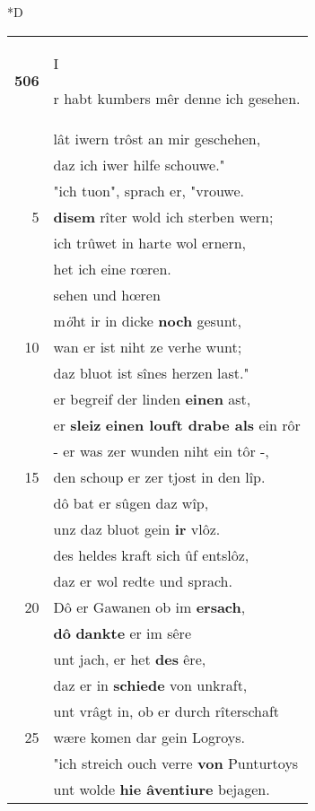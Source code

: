 \documentclass[8pt,a4paper,notitlepage]{article}
\begin{document}
\begin{table}[ht]
\begin{minipage}[t]{0.5\linewidth}
\small
\begin{center}*D
\end{center}
\begin{tabular}{rl}
\textbf{506} & \begin{large}I\end{large}r habt kumbers mêr denne ich gesehen.\\ 
 & lât iwern trôst an mir geschehen,\\ 
 & daz ich iwer hilfe schouwe."\\ 
 & "ich tuon", sprach er, "vrouwe.\\ 
5 & \textbf{disem} rîter wold ich sterben wern;\\ 
 & ich trûwet in harte wol ernern,\\ 
 & het ich eine rœren.\\ 
 & sehen und hœren\\ 
 & m\textit{ö}ht ir in dicke \textbf{noch} gesunt,\\ 
10 & wan er ist niht ze verhe wunt;\\ 
 & daz bluot ist sînes herzen last."\\ 
 & er begreif der linden \textbf{einen} ast,\\ 
 & er \textbf{sleiz} \textbf{einen louft drabe als} ein rôr\\ 
 & - er was zer wunden niht ein tôr -,\\ 
15 & den schoup er zer tjost in den lîp.\\ 
 & dô bat er sûgen daz wîp,\\ 
 & unz daz bluot gein \textbf{ir} vlôz.\\ 
 & des heldes kraft sich ûf entslôz,\\ 
 & daz er wol redte und sprach.\\ 
20 & Dô er Gawanen ob im \textbf{ersach},\\ 
 & \textbf{dô} \textbf{dankte} er im sêre\\ 
 & unt jach, er het \textbf{des} êre,\\ 
 & daz er in \textbf{schiede} von unkraft,\\ 
 & unt vrâgt in, ob er durch rîterschaft\\ 
25 & wære komen dar gein Logroys.\\ 
 & "ich streich ouch verre \textbf{von} Punturtoys\\ 
 & unt wolde \textbf{hie âventiure} bejagen.\\ 

\end{tabular}
\end{minipage}
\end{table}
\end{document}
